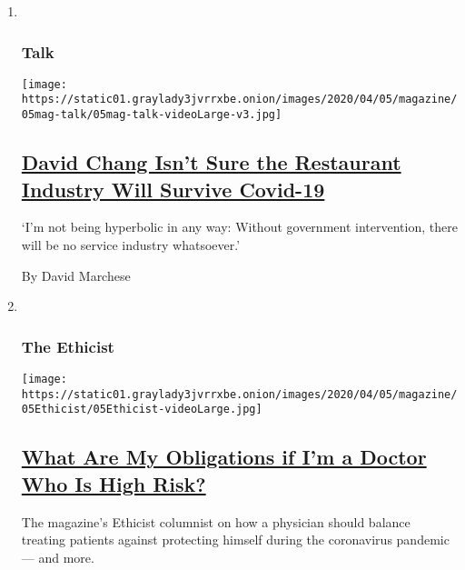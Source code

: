 \begin{enumerate}
\def\labelenumi{\arabic{enumi}.}
\item ~
  \hypertarget{talk}{%
  \subsubsection{Talk}\label{talk}}

  \texttt{[image: https://static01.graylady3jvrrxbe.onion/images/2020/04/05/magazine/05mag-talk/05mag-talk-videoLarge-v3.jpg]}

  \hypertarget{david-chang-isnt-sure-the-restaurant-industry-will-survive-covid-19}{%
  \subsection{\texorpdfstring{\href{/interactive/2020/03/27/magazine/david-chang-restaurants-covid19.html}{David
  Chang Isn't Sure the Restaurant Industry Will Survive
  Covid-19}}{David Chang Isn't Sure the Restaurant Industry Will Survive Covid-19}}\label{david-chang-isnt-sure-the-restaurant-industry-will-survive-covid-19}}

  `I'm not being hyperbolic in any way: Without government intervention,
  there will be no service industry whatsoever.'

  By David Marchese
\item ~
  \hypertarget{the-ethicist}{%
  \subsubsection{The Ethicist}\label{the-ethicist}}

  \texttt{[image: https://static01.graylady3jvrrxbe.onion/images/2020/04/05/magazine/05Ethicist/05Ethicist-videoLarge.jpg]}

  \hypertarget{what-are-my-obligations-if-im-a-doctor-who-is-high-risk}{%
  \subsection{\texorpdfstring{\href{/2020/03/30/magazine/coronavirus-medical-ethics.html}{What
  Are My Obligations if I'm a Doctor Who Is High
  Risk?}}{What Are My Obligations if I'm a Doctor Who Is High Risk?}}\label{what-are-my-obligations-if-im-a-doctor-who-is-high-risk}}

  The magazine's Ethicist columnist on how a physician should balance
  treating patients against protecting himself during the coronavirus
  pandemic --- and more.


\end{enumerate}
